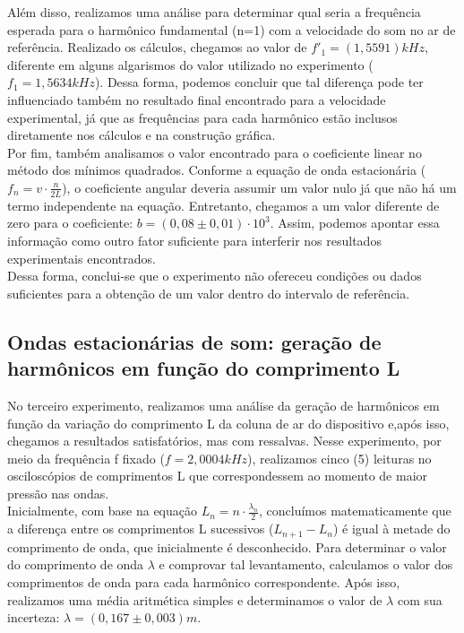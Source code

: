 Além disso, realizamos uma análise para determinar qual seria a frequência esperada para o harmônico fundamental (n=1) com a velocidade do som no ar de referência. Realizado os cálculos, chegamos ao valor de $f'_1 = (1,5591)kHz$, diferente em alguns algarismos do valor utilizado no experimento ($f_1 = 1,5634 kHz$). Dessa forma, podemos concluir que tal diferença pode ter influenciado também no resultado final encontrado para a velocidade experimental, já que as frequências para cada harmônico estão inclusos diretamente nos cálculos e na construção gráfica.\\

Por fim, também analisamos o valor encontrado para o coeficiente linear no método dos mínimos quadrados. Conforme a equação de onda estacionária ($f_n = v \cdot \frac{n}{2L}$), o coeficiente angular deveria assumir um valor nulo já que não há um termo independente na equação. Entretanto, chegamos a um valor diferente de zero para o coeficiente: $b = (0,08 \pm 0,01) \cdot 10^3$. Assim, podemos apontar essa informação como outro fator suficiente para interferir nos resultados experimentais encontrados.\\

Dessa forma, conclui-se que o experimento não ofereceu condições ou dados suficientes para a obtenção de um valor dentro do intervalo de referência.\\

\subsection{Ondas estacionárias de som: geração de harmônicos em
função do comprimento L}

No terceiro experimento, realizamos uma análise da geração de harmônicos em função da variação do comprimento L da coluna de ar do dispositivo e,após isso, chegamos a resultados satisfatórios, mas com ressalvas. Nesse experimento, por meio da frequência f fixado ($f = 2,0004 kHz$), realizamos cinco (5) leituras no osciloscópios de comprimentos L que correspondessem ao momento de maior pressão nas ondas. \\

Inicialmente, com base na equação $L_n = n \cdot \frac{\lambda_n}{2}$, concluímos matematicamente que a diferença entre os comprimentos L sucessivos ($L_{n+1} - L_n$) é igual à metade do comprimento de onda, que inicialmente é desconhecido. Para determinar o valor do comprimento de onda $\lambda$ e comprovar tal levantamento, calculamos o valor dos comprimentos de onda para cada harmônico correspondente. Após isso, realizamos uma média aritmética simples e determinamos o valor de $\lambda$ com sua incerteza: $\lambda = (0,167 \pm 0,003)m$.\\

